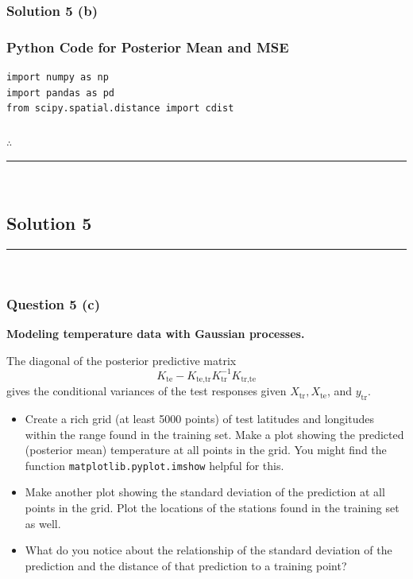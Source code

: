 \documentclass{article}
\begin{document}
\subsubsection*{Solution 5 (b)}

\subsubsection*{Python Code for Posterior Mean and MSE}
\begin{lstlisting}
import numpy as np
import pandas as pd
from scipy.spatial.distance import cdist
\end{lstlisting}

\subsubsection*{\normalfont}{$\therefore$ }

\noindent\rule{\textwidth}{0.4pt}\\

\newpage

\subsection*{Solution 5}
\noindent\rule{\textwidth}{0.4pt}\\
\subsubsection*{Question 5 (c)}
\begin{flushleft}
    \textbf{Modeling temperature data with Gaussian processes.} 
    
    The diagonal of the posterior predictive matrix 
    \[
    K_{\text{te}} - K_{\text{te,tr}} K_{\text{tr}}^{-1} K_{\text{tr,te}}
    \]
    gives the conditional variances of the test responses given $X_{\text{tr}}, X_{\text{te}}$, and $y_{\text{tr}}$. 
    \begin{itemize}
        \item Create a rich grid (at least 5000 points) of test latitudes and longitudes within the range found in the training set. 
        Make a plot showing the predicted (posterior mean) temperature at all points in the grid. 
        You might find the function \texttt{matplotlib.pyplot.imshow} helpful for this. 
        \item Make another plot showing the standard deviation of the prediction at all points in the grid. 
        Plot the locations of the stations found in the training set as well. 
        \item What do you notice about the relationship of the standard deviation of the prediction and the distance of that prediction to a training point? 
    \end{itemize}
\end{flushleft}
\end{document}
